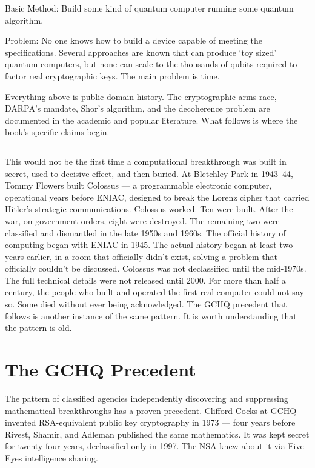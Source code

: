 Basic Method: Build some kind of quantum computer running some quantum algorithm.

Problem: No one knows how to build a device capable of meeting the specifications.  Several approaches are known that can produce `toy sized' quantum computers, but none can scale to the thousands of qubits required to factor real cryptographic keys.  The main problem is  time.

Everything above is public-domain history. The cryptographic arms race, DARPA's mandate, Shor's algorithm, and the decoherence problem are documented in the academic and popular literature. What follows is where the book's specific claims begin.

\vspace{1cm}\noindent\rule{0.5\textwidth}{0.5pt}\vspace{0.5cm}

This would not be the first time a computational breakthrough was built in secret, used to decisive effect, and then buried. At Bletchley Park in 1943--44, Tommy Flowers built Colossus --- a programmable electronic computer, operational years before ENIAC, designed to break the Lorenz cipher that carried Hitler's strategic communications. Colossus worked. Ten were built. After the war, on government orders, eight were destroyed. The remaining two were classified and dismantled in the late 1950s and 1960s. The official history of computing began with ENIAC in 1945. The actual history began at least two years earlier, in a room that officially didn't exist, solving a problem that officially couldn't be discussed. Colossus was not declassified until the mid-1970s. The full technical details were not released until 2000. For more than half a century, the people who built and operated the first real computer could not say so. Some died without ever being acknowledged. The GCHQ precedent that follows is another instance of the same pattern. It is worth understanding that the pattern is old.

\section*{The GCHQ Precedent}
\label{pos09:the-gchq-precedent}


The pattern of classified agencies independently discovering and suppressing mathematical breakthroughs has a proven precedent. Clifford Cocks at GCHQ invented RSA-equivalent public key cryptography in 1973 --- four years before Rivest, Shamir, and Adleman published the same mathematics. It was kept secret for twenty-four years, declassified only in 1997. The NSA knew about it via Five Eyes intelligence sharing.

